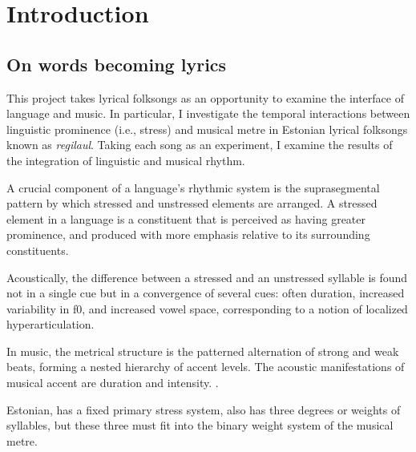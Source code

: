 \chapter{Introduction}

\section{On words becoming lyrics}

This project takes lyrical folksongs as an opportunity to examine the interface of language and music. In particular, I investigate the temporal interactions between linguistic prominence (i.e., stress) and musical metre in Estonian lyrical folksongs known as {\it regilaul}. Taking each song as an experiment, I examine the results of the integration of linguistic and musical rhythm. 

A crucial component of a language's rhythmic system is the suprasegmental pattern by which stressed and unstressed elements are arranged. A stressed element in a language is a constituent that is perceived as having greater prominence, and produced with more emphasis relative to its surrounding constituents. 

Acoustically, the difference between a stressed and an unstressed syllable is found not in a single cue but in a convergence of several cues: often duration, increased variability in f0, and increased vowel space, corresponding to a notion of localized hyperarticulation\cite{smiljanicProductionPerceptionClear2005,de1995supraglottal}. 

In music, the metrical structure is the patterned alternation of strong and weak beats, forming a nested hierarchy of accent levels. The acoustic manifestations of musical accent are duration and intensity. 
\citep{palmerLinguisticProsodyMusical1992}. 

Estonian, has a fixed primary stress system, also has three degrees or weights of syllables, but these three must fit into the binary weight system of the musical metre. 

